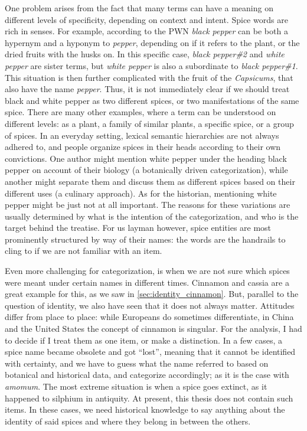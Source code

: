 One problem arises from the fact that many terms can have a meaning on different levels of specificity, depending on context and intent. Spice words are rich in senses. For example, according to the \gls{PWN} \textit{black pepper} can be both a hypernym and a hyponym to \textit{pepper}, depending on if it refers to the plant, or the dried fruits with the husks on. In this specific case, \textit{black pepper\#2} and \textit{white pepper} are sister terms, but \textit{white pepper} is also a subordinate to \textit{black pepper\#1}. This situation is then further complicated with the fruit of the \textit{Capsicums}, that also have the name \textit{pepper}. Thus, it is not immediately clear if we should treat black and white pepper as two different spices, or two manifestations of the same spice. There are many other examples, where a term can be understood on different levels: as a plant, a family of similar plants, a specific spice, or a group of spices. In an everyday setting, lexical semantic hierarchies are not always adhered to, and people organize spices in their heads according to their own convictions. One author might mention white pepper under the heading black pepper on account of their biology (a botanically driven categorization), while another might separate them and discuss them as different spices based on their different uses (a culinary approach). As for the historian, mentioning white pepper might be just not at all important. The reasons for these variations are usually determined by what is the intention of the categorization, and who is the target behind the treatise. For us layman however, spice entities are most prominently structured by way of their names: the words are the handrails to cling to if we are not familiar with an item.


Even more challenging for categorization, is when we are not sure which spices were meant under certain names in different times. Cinnamon and cassia are a great example for this, as we saw in \cref{sec:identity_cinnamon}. But, parallel to the question of identity, we also have seen that it does not always matter. Attitudes differ from place to place: while Europeans do sometimes differentiate, in China and the United States the concept of cinnamon is singular. For the analysis, I had to decide if I treat them as one item, or make a distinction. In a few cases, a spice name became obsolete and got ``lost'', meaning that it cannot be identified with certainty, and we have to guess what the name referred to based on botanical and historical data, and categorize accordingly; as it is the case with \textit{amomum}. The most extreme situation is when a spice goes extinct, as it happened to silphium in antiquity. At present, this thesis does not contain such items. In these cases, we need historical knowledge to say anything about the identity of said spices and where they belong in between the others.

